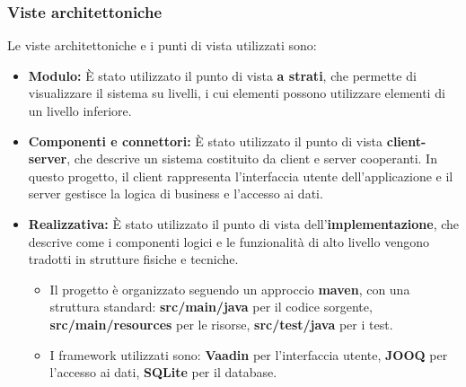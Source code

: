 \documentclass[a4paper,12pt]{article}
\begin{document}
\subsubsection{Viste architettoniche}
Le viste architettoniche e i punti di vista utilizzati sono:
\begin{itemize}
    \item \textbf{Modulo:} È stato utilizzato il punto di vista \textbf{a strati}, che permette di visualizzare il sistema su livelli, i cui elementi possono utilizzare elementi di un livello inferiore.  
    \item \textbf{Componenti e connettori:} È stato utilizzato il punto di vista \textbf{client-server}, che descrive un sistema costituito da client e server cooperanti. In questo progetto, il client rappresenta l'interfaccia utente dell'applicazione e il server gestisce la logica di business e l'accesso ai dati.
    \item \textbf{Realizzativa:} È stato utilizzato il punto di vista dell'\textbf{implementazione}, che descrive come i componenti logici e le funzionalità di alto livello vengono tradotti in strutture fisiche e tecniche. 
    \begin{itemize}
        \item Il progetto è organizzato seguendo un approccio \textbf{maven}, con una struttura standard: \textbf{src/main/java} per il codice sorgente, \textbf{src/main/resources} per le risorse, \textbf{src/test/java} per i test.
        \item I framework utilizzati sono: \textbf{Vaadin} per l'interfaccia utente, \textbf{JOOQ} per l'accesso ai dati, \textbf{SQLite} per il database.
    \end{itemize}
\end{itemize}
\end{document}
